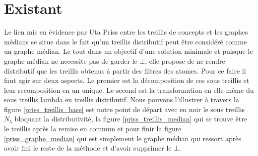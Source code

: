 \chapter{Existant}

Le lien mis en évidence par Uta Priss entre les treillis de concepts et les graphes médians se situe dans le fait qu'un treillis distributif peut être considéré comme un graphe médian. Le tout dans un objectif d'une solution minimale et puisque le graphe médian ne necessite pas de garder le $\bot$, elle propose de ne rendre distributif que les treillis obtenus à partir des filtres des atomes. Pour ce faire il faut agir sur deux aspects. Le premier est la décomposition de ces sous treillis et leur recomposition en un unique. Le second est la transformation en elle-même du sous treillis lambda en treillis distributif. Nous pouvons l'illustrer à travers la figure \ref{priss_treillis_base} est notre point de départ avec en noir le sous treillis $N_5$ bloquant la distributivité, la figure \ref{priss_treillis_median} qui se trouve être le treillis après la remise en commun et pour finir la figure \ref{priss_graphe_median} qui est simplement le graphe médian qui ressort après avoir fini le reste de la méthode et d'avoir supprimer le $\bot$.

